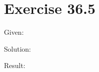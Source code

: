 \documentclass[a4paper, 10pt]{scrartcl}
\begin{document}
\section{Exercise 36.5}

Given:

Solution:

Result:
\end{document}
